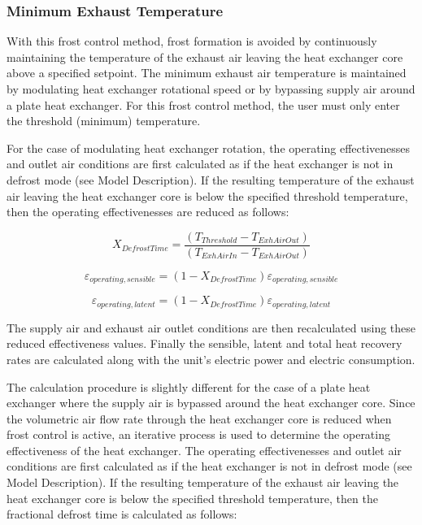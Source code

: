 \subsubsection{Minimum Exhaust Temperature}\label{minimum-exhaust-temperature}

With this frost control method, frost formation is avoided by continuously maintaining the temperature of the exhaust air leaving the heat exchanger core above a specified setpoint. The minimum exhaust air temperature is maintained by modulating heat exchanger rotational speed or by bypassing supply air around a plate heat exchanger. For this frost control method, the user must only enter the threshold (minimum) temperature.

For the case of modulating heat exchanger rotation, the operating effectivenesses and outlet air conditions are first calculated as if the heat exchanger is not in defrost mode (see Model Description). If the resulting temperature of the exhaust air leaving the heat exchanger core is below the specified threshold temperature, then the operating effectivenesses are reduced as follows:

\begin{equation}
{X_{DefrostTime}} = \frac{{({T_{Threshold}} - {T_{ExhAirOut}})}}{{({T_{ExhAirIn}} - {T_{ExhAirOut}})}}
\end{equation}

\begin{equation}
{\varepsilon_{operating,sensible}} = (1 - {X_{DefrostTime}}){\varepsilon_{operating,sensible}}
\end{equation}

\begin{equation}
{\varepsilon_{operating,latent}} = (1 - {X_{DefrostTime}}){\varepsilon_{operating,latent}}
\end{equation}

The supply air and exhaust air outlet conditions are then recalculated using these reduced effectiveness values. Finally the sensible, latent and total heat recovery rates are calculated along with the unit's electric power and electric consumption.

The calculation procedure is slightly different for the case of a plate heat exchanger where the supply air is bypassed around the heat exchanger core. Since the volumetric air flow rate through the heat exchanger core is reduced when frost control is active, an iterative process is used to determine the operating effectiveness of the heat exchanger. The operating effectivenesses and outlet air conditions are first calculated as if the heat exchanger is not in defrost mode (see Model Description). If the resulting temperature of the exhaust air leaving the heat exchanger core is below the specified threshold temperature, then the fractional defrost time is calculated as follows:

